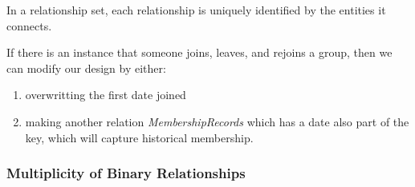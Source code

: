 \documentclass{article}
\begin{document}
    \begin{theorem}
      In a relationship set, each relationship is uniquely identified by the entities it connects. 
    \end{theorem}

    If there is an instance that someone joins, leaves, and rejoins a group, then we can modify our design by either: 
    \begin{enumerate}
      \item overwritting the first date joined 
      \item making another relation \textit{MembershipRecords} which has a date also part of the key, which will capture historical membership.  
    \end{enumerate}

    \subsubsection{Multiplicity of Binary Relationships}
\end{document}
